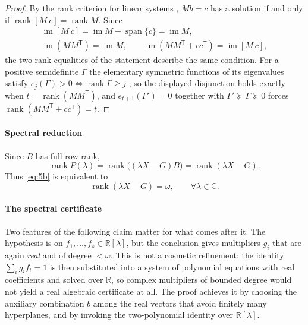 \documentclass[journal]{IEEEtran}
\theoremstyle{plainn}
\theoremstyle{remark}
\begin{document}
\begin{proof}
By the rank criterion for linear systems \cite[Ch.~0]{hj13}, $Mb=c$ has a solution if and only if
$\operatorname{rank}[M\ c]=\operatorname{rank}M$. Since
\begin{equation*}
\begin{gathered}
\operatorname{im}[M\ c]=\operatorname{im}M+\operatorname{span}\{c\}=\operatorname{im}M,\\
\operatorname{im}(MM^{\mathsf T})=\operatorname{im}M,\qquad
\operatorname{im}(MM^{\mathsf T}+cc^{\mathsf T})=\operatorname{im}[M\ c],
\end{gathered}
\end{equation*}
the two rank equalities of the statement describe the same condition. For a positive semidefinite
$\Gamma$ the elementary symmetric functions of its eigenvalues satisfy
$e_j(\Gamma)>0\iff\operatorname{rank}\Gamma\ge j$ \cite[Ch.~4]{hj13}, so the displayed disjunction
holds exactly when $t=\operatorname{rank}(MM^{\mathsf T})$, and
$e_{t+1}(\Gamma')=0$ together with $\Gamma'\succeq\Gamma\succeq0$ forces
$\operatorname{rank}(MM^{\mathsf T}+cc^{\mathsf T})=t$.
\end{proof}

\paragraph*{Spectral reduction}\label{sec:spectral}
Since $B$ has full row rank,
\begin{equation*}
\operatorname{rank}P(\lambda)
=\operatorname{rank}\bigl((\lambda X-G)B\bigr)
=\operatorname{rank}(\lambda X-G).
\end{equation*}
Thus \eqref{eq:5b} is equivalent to
\begin{equation}
\operatorname{rank}(\lambda X-G)=\omega,\qquad\forall\lambda\in\mathbb C .
\end{equation}

\paragraph*{The spectral certificate}\label{sec:spectrum}

Two features of the following claim matter for what comes after it. The hypothesis is on
$f_1,\dots,f_s\in\mathbb R[\lambda]$, but the conclusion gives multipliers $g_i$ that are again
\emph{real} and of degree $<\omega$. This is not a cosmetic refinement: the identity
$\sum_ig_if_i=1$ is then substituted into a system of polynomial equations with real coefficients and
solved over $\mathbb R$, so complex multipliers of bounded degree would not yield a real algebraic
certificate at all. The proof achieves it by choosing the auxiliary combination $b$ among the real
vectors that avoid finitely many hyperplanes, and by invoking the two-polynomial identity over
$\mathbb R[\lambda]$.
\end{document}
